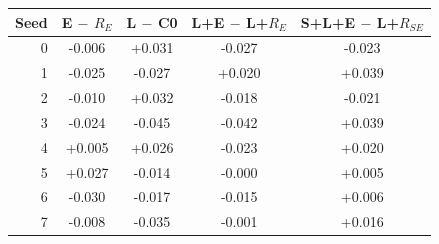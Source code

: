 \begin{tabular}{@{}rcccc@{}}
\toprule
Seed & E $-$ $R_E$ & L $-$ C0 & L+E $-$ L+$R_E$ & S+L+E $-$ L+$R_{SE}$\\
\midrule
0 & -0.006 & +0.031 & -0.027 & -0.023\\
1 & -0.025 & -0.027 & +0.020 & +0.039\\
2 & -0.010 & +0.032 & -0.018 & -0.021\\
3 & -0.024 & -0.045 & -0.042 & +0.039\\
4 & +0.005 & +0.026 & -0.023 & +0.020\\
5 & +0.027 & -0.014 & -0.000 & +0.005\\
6 & -0.030 & -0.017 & -0.015 & +0.006\\
7 & -0.008 & -0.035 & -0.001 & +0.016\\
\bottomrule
\end{tabular}
